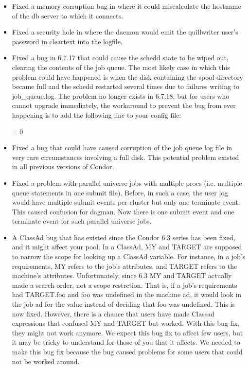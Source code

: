 \begin{itemize}

\item Fixed a memory corruption bug in  where it could
miscalculate the hostname of the db server to which it connects.

\item Fixed a security hole in  where the daemon would
emit the quillwriter user's password in cleartext into the 
logfile.

\item Fixed a bug in 6.7.17 that could cause the schedd state to be
wiped out, clearing the contents of the job queue.  The most likely
case in which this problem could have happened is when the disk
containing the spool directory became full and the schedd restarted
several times due to failures writing to job\_queue.log.  The problem
no longer exists in 6.7.18, but for users who cannot upgrade
immediately, the workaround to prevent the bug from ever happening is
to add the following line to your config file:

 = 0

\item Fixed a bug that could have caused corruption of the job queue
log file in very rare circumstances involving a full disk.  This
potential problem existed in all previous versions of Condor.

\item Fixed a problem with parallel universe jobs with multiple
procs (i.e. multiple queue statements in one submit file).
Before, in such a case, the user log would have multiple
submit events per cluster but only one terminate event.  This caused
confusion for dagman.  Now there is one submit event and one terminate
event for such parallel universe jobs.

\item A ClassAd bug that has existed since the Condor 6.3 series has
been fixed, and it might affect your pool. In a ClassAd, MY and TARGET
are supposed to narrow the scope for looking up a ClassAd
variable. For instance, in a job's requirements, MY refers to the
job's attributes, and TARGET refers to the machine's
attributes. Unfortunately, since 6.3 MY and TARGET actually made a
search order, not a scope restrction. That is, if a job's requirements
had TARGET.foo and foo was undefined in the machine ad, it would look
in the job ad for the value instead of deciding that foo was
undefined. This is now fixed. However, there is a chance that users
have made Classad expressions that confused MY and TARGET but
worked. With this bug fix, they might not work anymore. We expect this
bug fix to affect few users, but it may be tricky to understand for
those of you that it affects. We needed to make this bug fix because
the bug caused problems for some users that could not be worked
around.


\end{itemize}
